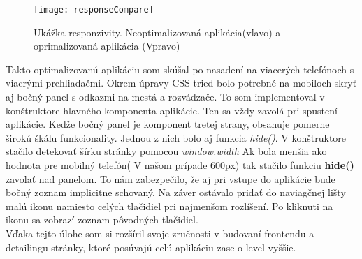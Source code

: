 \documentclass[11pt, oneside]{report}
\begin{document}
\begin{figure}[H]
    \centering
    \texttt{[image: responseCompare]}
    \caption{Ukážka responzivity. Neoptimalizovaná aplikácia(vľavo) a oprimalizovaná aplikácia (Vpravo) }
    \label{fig:responseCompare}
\end{figure}
Takto optimalizovanú aplikáciu som skúšal po nasadení na viacerých telefónoch s viacrými prehliadačmi. Okrem úpravy CSS tried bolo potrebné na mobiloch skryť aj  bočný panel s  odkazmi na mestá a rozvádzače. To som  implementoval v konštruktore hlavného komponenta  aplikácie. Ten sa vždy zavolá pri spustení aplikácie. Keďže bočný panel je komponent tretej strany, obsahuje  pomerne širokú škálu  funkcionality. Jednou z nich bolo aj funkcia \textit{hide()}. V konštruktore  stačilo detekovať šírku stránky pomocou \textit{window.width} Ak bola menšia ako  hodnota pre mobilný telefón( V našom prípade 600px) tak stačilo funkciu \textbf{hide()} zavolať nad panelom. To nám zabezpečilo, že aj  pri vstupe do aplikácie bude bočný zoznam implicitne schovaný. Na záver ostávalo pridať do naviagčnej lišty malú ikonu namiesto celých tlačidiel pri najmenšom rozlíšení. Po kliknuti na ikonu sa zobrazí zoznam pôvodných tlačidiel.\\ Vďaka tejto úlohe som si rozšíril  svoje zručnosti v budovaní frontendu a  detailingu stránky, ktoré posúvajú celú aplikáciu zase o level vyššie.
\newpage
\end{document}
